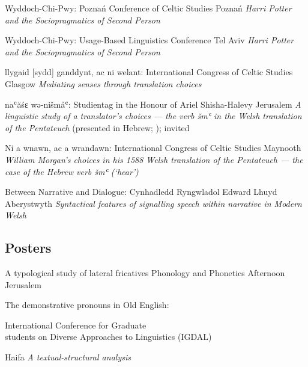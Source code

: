 	{Wyddoch-Chi-Pwy:}
	{ Poznań Conference of Celtic Studies}
	{Poznań}
	{}
	{\emph{Harri Potter and the Sociopragmatics of Second Person}}

	{Wyddoch-Chi-Pwy:}
	{ Usage-Based Linguistics Conference}
	{Tel Aviv}
	{}
	{\emph{Harri Potter and the Sociopragmatics of Second Person}}

	{llygaid [sydd] ganddynt, ac ni welant:}
	{ International Congress of Celtic Studies}
	{Glasgow}
	{}
	{\emph{Mediating senses through translation choices}}

	{na{ʿ}ăśɛ wə-nišmå{ʿ}:}
	{Studientag in the Honour of Ariel Shisha-Halevy}
	{Jerusalem}
	{}
	{\emph{A linguistic study of a translator’s choices — the verb \emph{šm{ʿ}} in the Welsh translation of the Pentateuch} (presented in Hebrew; ); invited}

	{Ni a wnawn, ac a wrandawn:}
	{ International Congress of Celtic Studies}
	{Maynooth}
	{}
	{\emph{William Morgan’s choices in his 1588 Welsh translation of the Pentateuch — the case of the Hebrew verb \emph{šm{ʿ}} (‘hear’)}}

	{Between Narrative and Dialogue:}
	{Cynhadledd Ryngwladol Edward Lhuyd}
	{Aberystwyth}
	{}
	{\emph{Syntactical features of signalling speech within narrative in Modern Welsh}}

	

\subsection{Posters}

	{A typological study of lateral fricatives}
	{Phonology and Phonetics Afternoon}
	{Jerusalem}
	{}
	{}

	{The demonstrative pronouns in Old English:}
	{\parbox[t]{0.8\textwidth}{ International Conference for Graduate\\students on Diverse Approaches to Linguistics (IGDAL)}}
	{Haifa}
	{}
	{\emph{A textual-structural analysis}}



